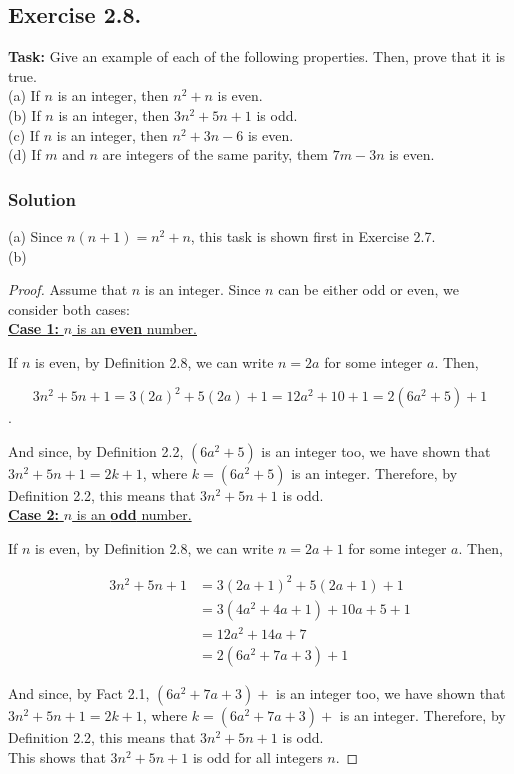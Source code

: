 \documentclass{article}
\begin{document}
\subsection{Exercise 2.8.}
\textbf{Task:} Give an example of each of the following properties. Then, prove that it is true.\\
(a) If $n$ is an integer, then $n^2+n$ is even.\\
(b) If $n$ is an integer, then $3n^2+5n+1$ is odd.\\
(c) If $n$ is an integer, then $n^2+3n-6$ is even.\\
(d) If $m$ and $n$ are integers of the same parity, them $7m-3n$ is even.

\subsubsection*{Solution}

(a) Since $n(n+1) = n^2 + n$, this task is shown first in Exercise 2.7.\\
(b) 

\begin{proof}
    Assume that $n$ is an integer. Since $n$ can be either odd or even, we consider both cases:\\

    \noindent \underline{\textbf{Case 1:} $n$ is an \textbf{even} number.}
    
    \noindent If $n$ is even, by Definition 2.8, we can write $n = 2a$ for some integer $a$. Then,

    \[3n^2+5n+1=3(2a)^2+5(2a)+1=12a^2+10+1=2(6a^2+5)+1\].

    And since, by Definition 2.2, $(6a^2+5)$ is an integer too, we have shown that $3n^2+5n+1=2k+1$, where $k=(6a^2+5)$ is an integer. Therefore, by Definition 2.2, this means that $3n^2+5n+1$ is odd. \\

    \noindent \underline{\textbf{Case 2:} $n$ is an \textbf{odd} number.}
    
    \noindent If $n$ is even, by Definition 2.8, we can write $n = 2a+1$ for some integer $a$. Then,

    \begin{align*}
        3n^2+5n+1&=3(2a+1)^2+5(2a+1)+1\\
        &= 3(4a^2+4a+1)+10a+5+1 \\
        &= 12a^2+14a+7 \\
        &= 2(6a^2+7a+3)+1
    \end{align*}

    And since, by Fact 2.1, $(6a^2+7a+3)+$ is an integer too, we have shown that $3n^2+5n+1=2k+1$, where $k=(6a^2+7a+3)+$ is an integer. Therefore, by Definition 2.2, this means that $3n^2+5n+1$ is odd. \\

    This shows that $3n^2+5n+1$ is odd for all integers $n$.
\end{proof}
\end{document}
